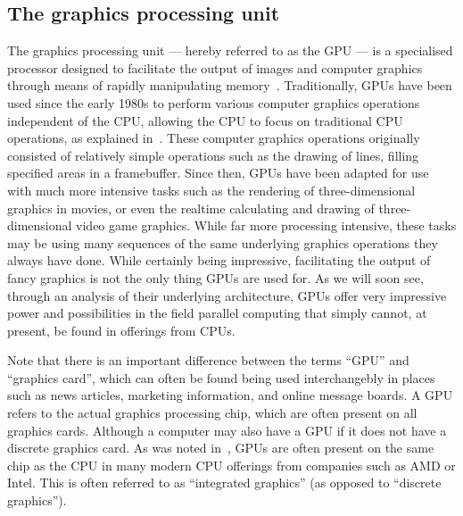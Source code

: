 \documentclass[a4paper,11pt]{article}
\begin{document}
\subsection{The graphics processing unit} %
\label{sub:the_graphics_processing_unit}
The graphics processing unit --- hereby referred to as the GPU --- is a specialised processor designed to facilitate the
output of images and computer graphics through means of rapidly manipulating memory~\cite{web:WikiGPU}. Traditionally,
GPUs have been used since the early 1980s to perform various computer graphics operations independent of the CPU, allowing
the CPU to focus on traditional CPU operations, as explained in~. These
computer graphics operations originally consisted of relatively simple operations such as the drawing of lines, filling
specified areas in a framebuffer. Since then, GPUs have been adapted for use with much more intensive tasks such as
the rendering of three-dimensional graphics in movies, or even the realtime calculating and drawing of three-dimensional
video game graphics. While far more processing intensive, these tasks may be using many sequences of the same underlying
graphics operations they always have done. While certainly being impressive, facilitating the output of fancy graphics is
not the only thing GPUs are used for. As we will soon see, through an analysis of their underlying architecture, GPUs
offer very impressive power and possibilities in the field parallel computing that simply cannot, at present, be found
in offerings from CPUs.

Note that there is an important difference between the terms ``GPU'' and ``graphics card'', which can often be found
being used interchangebly in places such as news articles, marketing information, and online message boards. A GPU refers
to the actual graphics processing chip, which are often present on all graphics cards. Although a computer may also have
a GPU if it does not have a discrete graphics card. As was noted in~, GPUs are
often present on the same chip as the CPU in many modern CPU offerings from companies such as AMD or Intel. This is
often referred to as ``integrated graphics'' (as opposed to ``discrete graphics'').
\end{document}
